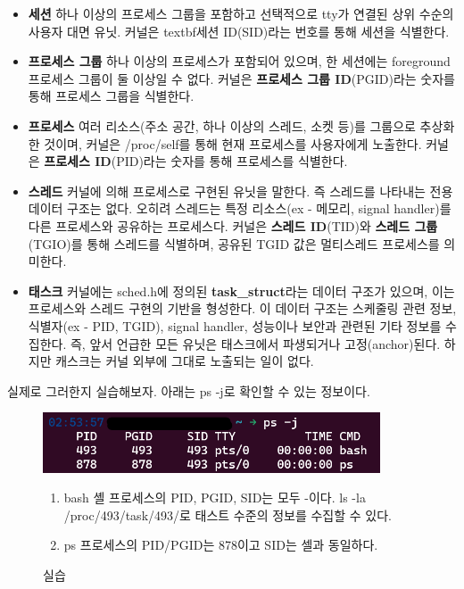 \begin{itemize}
    \item \textbf{세션}\newline
        하나 이상의 프로세스 그룹을 포함하고 선택적으로 tty가 연결된 
        상위 수순의 사용자 대면 유닛.
        커널은 textbf{세션 ID}(SID)라는 번호를 통해 세션을 식별한다.
    \item \textbf{프로세스 그룹}\newline
        하나 이상의 프로세스가 포함되어 있으며, 
        한 세션에는 foreground 프로세스 그룹이 둘 이상일 수 없다.
        커널은 \textbf{프로세스 그룹 ID}(PGID)라는 숫자를 통해 프로세스 그룹을 식별한다.
    \item \textbf{프로세스}\newline
        여러 리소스(주소 공간, 하나 이상의 스레드, 소켓 등)를 그룹으로 추상화한 것이며, 
        커널은 /proc/self를 통해 현재 프로세스를 사용자에게 노출한다.
        커널은 \textbf{프로세스 ID}(PID)라는 숫자를 통해 프로세스를 식별한다.
    \item \textbf{스레드}\newline
        커널에 의해 프로세스로 구현된 유닛을 말한다.
        즉 스레드를 나타내는 전용 데이터 구조는 없다.
        오히려 스레드는 특정 리소스(ex - 메모리, signal handler)를 다른 프로세스와 공유하는 프로세스다.
        커널은 \textbf{스레드 ID}(TID)와 \textbf{스레드 그룹}(TGIO)를 통해 스레드를 식별하며,
        공유된 TGID 값은 멀티스레드 프로세스를 의미한다.
    \item \textbf{태스크}\newline
        커널에는 sched.h에 정의된 \textbf{task\_struct}라는 데이터 구조가 있으며, 
        이는 프로세스와 스레드 구현의 기반을 형성한다.
        이 데이터 구조는 스케줄링 관련 정보, 식별자(ex - PID, TGID), signal handler,
        성능이나 보안과 관련된 기타 정보를 수집한다.
        즉, 앞서 언급한 모든 유닛은 태스크에서 파생되거나 고정(anchor)된다.
        하지만 캐스크는 커널 외부에 그대로 노출되는 일이 없다.
\end{itemize}

\begin{flushleft}
    실제로 그러한지 실습해보자.\newline
    아래는 ps -j로 확인할 수 있는 정보이다.
\end{flushleft}

\begin{figure}[h]
    \centering
    \includegraphics[width=10cm]{resource/ps-example.png}
    \caption{실습}
    \begin{enumerate}
        \item bash 셸 프로세스의 PID, PGID, SID는 모두 -이다.\newline
            ls -la /proc/493/task/493/로 태스트 수준의 정보를 수집할 수 있다.
        \item ps 프로세스의 PID/PGID는 878이고 SID는 셀과 동일하다.
    \end{enumerate}
\end{figure}

